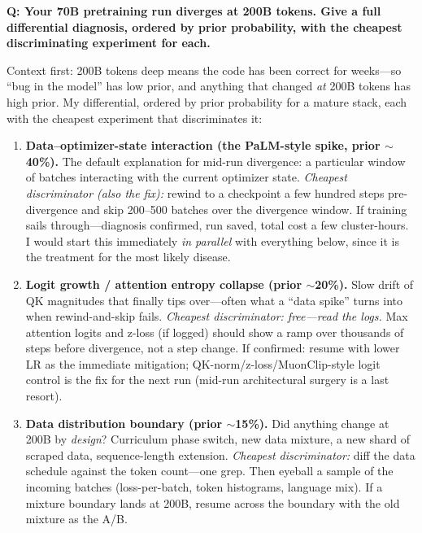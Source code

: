 \begin{interviewq}
\textbf{Q: Your 70B pretraining run diverges at 200B tokens. Give a full differential diagnosis, ordered by prior probability, with the cheapest discriminating experiment for each.}

 \quad {} \quad \badgefreq{\freqhigh}

\stronganswer

Context first: 200B tokens deep means the code has been correct for weeks---so ``bug in the model'' has low prior, and anything that changed \emph{at} 200B tokens has high prior. My differential, ordered by prior probability for a mature stack, each with the cheapest experiment that discriminates it:

\begin{enumerate}
    \item \textbf{Data--optimizer-state interaction (the PaLM-style spike, prior $\sim$40\%).} The default explanation for mid-run divergence: a particular window of batches interacting with the current optimizer state. \textit{Cheapest discriminator (also the fix):} rewind to a checkpoint a few hundred steps pre-divergence and skip 200--500 batches over the divergence window. If training sails through---diagnosis confirmed, run saved, total cost a few cluster-hours. I would start this immediately \emph{in parallel} with everything below, since it is the treatment for the most likely disease.

    \item \textbf{Logit growth / attention entropy collapse (prior $\sim$20\%).} Slow drift of QK magnitudes that finally tips over---often what a ``data spike'' turns into when rewind-and-skip fails. \textit{Cheapest discriminator: free---read the logs.} Max attention logits and z-loss (if logged) should show a ramp over thousands of steps before divergence, not a step change. If confirmed: resume with lower LR as the immediate mitigation; QK-norm/z-loss/MuonClip-style logit control is the fix for the next run (mid-run architectural surgery is a last resort).

    \item \textbf{Data distribution boundary (prior $\sim$15\%).} Did anything change at 200B by \emph{design}? Curriculum phase switch, new data mixture, a new shard of scraped data, sequence-length extension. \textit{Cheapest discriminator:} diff the data schedule against the token count---one grep. Then eyeball a sample of the incoming batches (loss-per-batch, token histograms, language mix). If a mixture boundary lands at 200B, resume across the boundary with the old mixture as the A/B.


\end{enumerate}
\end{interviewq}
